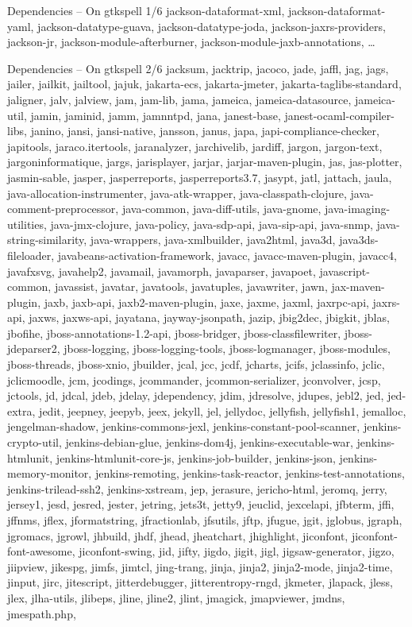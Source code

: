 \documentclass{beamer}
\begin{document}
\begin{frame}{Dependencies – On gtkspell 1/6}
jackson-dataformat-xml, jackson-dataformat-yaml, jackson-datatype-guava, jackson-datatype-joda, jackson-jaxrs-providers, jackson-jr, jackson-module-afterburner, jackson-module-jaxb-annotations, …
\end{frame}

\begin{frame}{Dependencies – On gtkspell 2/6}
\tiny jacksum, jacktrip, jacoco, jade, jaffl, jag, jags, jailer, jailkit, jailtool, jajuk, jakarta-ecs, jakarta-jmeter, jakarta-taglibs-standard, jaligner, jalv, jalview, jam, jam-lib, jama, jameica, jameica-datasource, jameica-util, jamin, jaminid, jamm, jamnntpd, jana, janest-base, janest-ocaml-compiler-libs, janino, jansi, jansi-native, jansson, janus, japa, japi-compliance-checker, japitools, jaraco.itertools, jaranalyzer, jarchivelib, jardiff, jargon, jargon-text, jargoninformatique, jargs, jarisplayer, jarjar, jarjar-maven-plugin, jas, jas-plotter, jasmin-sable, jasper, jasperreports, jasperreports3.7, jasypt, jatl, jattach, jaula, java-allocation-instrumenter, java-atk-wrapper, java-classpath-clojure, java-comment-preprocessor, java-common, java-diff-utils, java-gnome, java-imaging-utilities, java-jmx-clojure, java-policy, java-sdp-api, java-sip-api, java-snmp, java-string-similarity, java-wrappers, java-xmlbuilder, java2html, java3d, java3ds-fileloader, javabeans-activation-framework, javacc, javacc-maven-plugin, javacc4, javafxsvg, javahelp2, javamail, javamorph, javaparser, javapoet, javascript-common, javassist, javatar, javatools, javatuples, javawriter, jawn, jax-maven-plugin, jaxb, jaxb-api, jaxb2-maven-plugin, jaxe, jaxme, jaxml, jaxrpc-api, jaxrs-api, jaxws, jaxws-api, jayatana, jayway-jsonpath, jazip, jbig2dec, jbigkit, jblas, jbofihe, jboss-annotations-1.2-api, jboss-bridger, jboss-classfilewriter, jboss-jdeparser2, jboss-logging, jboss-logging-tools, jboss-logmanager, jboss-modules, jboss-threads, jboss-xnio, jbuilder, jcal, jcc, jcdf, jcharts, jcifs, jclassinfo, jclic, jclicmoodle, jcm, jcodings, jcommander, jcommon-serializer, jconvolver, jcsp, jctools, jd, jdcal, jdeb, jdelay, jdependency, jdim, jdresolve, jdupes, jebl2, jed, jed-extra, jedit, jeepney, jeepyb, jeex, jekyll, jel, jellydoc, jellyfish, jellyfish1, jemalloc, jengelman-shadow, jenkins-commons-jexl, jenkins-constant-pool-scanner, jenkins-crypto-util, jenkins-debian-glue, jenkins-dom4j, jenkins-executable-war, jenkins-htmlunit, jenkins-htmlunit-core-js, jenkins-job-builder, jenkins-json, jenkins-memory-monitor, jenkins-remoting, jenkins-task-reactor, jenkins-test-annotations, jenkins-trilead-ssh2, jenkins-xstream, jep, jerasure, jericho-html, jeromq, jerry, jersey1, jesd, jesred, jester, jetring, jets3t, jetty9, jeuclid, jexcelapi, jfbterm, jffi, jffnms, jflex, jformatstring, jfractionlab, jfsutils, jftp, jfugue, jgit, jglobus, jgraph, jgromacs, jgrowl, jhbuild, jhdf, jhead, jheatchart, jhighlight, jiconfont, jiconfont-font-awesome, jiconfont-swing, jid, jifty, jigdo, jigit, jigl, jigsaw-generator, jigzo, jiipview, jikespg, jimfs, jimtcl, jing-trang, jinja, jinja2, jinja2-mode, jinja2-time, jinput, jirc, jitescript, jitterdebugger, jitterentropy-rngd, jkmeter, jlapack, jless, jlex, jlha-utils, jlibeps, jline, jline2, jlint, jmagick, jmapviewer, jmdns, jmespath.php, 
\end{frame}
\end{document}
